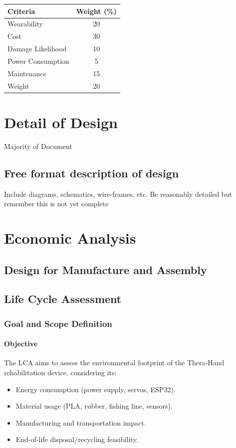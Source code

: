 \documentclass{article}
\begin{document}
\begin{table}[h]
    \centering
    \begin{tabular}{l c}
        \toprule
        \textbf{Criteria} & \textbf{Weight (\%)} \\
        \midrule
        Wearability & 20 \\
        Cost & 30 \\
        Damage Likelihood & 10 \\
        Power Consumption & 5 \\
        Maintenance & 15 \\
        Weight & 20 \\
        \bottomrule
    \end{tabular}
\end{table}

\section{Detail of Design}
Majority of Document

\subsection{Free format description of design}
Include diagrams, schematics, wire-frames, etc.
Be reasonably detailed but remember this is not yet complete

\section{Economic Analysis}

\subsection{Design for Manufacture and Assembly}

\subsection{Life Cycle Assessment}
\subsubsection{Goal and Scope Definition}
\paragraph{Objective}
The LCA aims to assess the environmental footprint of the Thera-Hand rehabilitation device, considering its:
\begin{itemize}
\item Energy consumption (power supply, servos, ESP32).
\item Material usage (PLA, rubber, fishing line, sensors).
\item Manufacturing and transportation impact.
\item End-of-life disposal/recycling feasibility.
\end{itemize}
\end{document}
